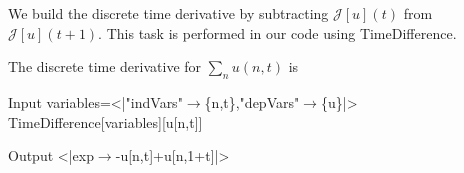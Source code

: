 \documentclass[runningheads]{llncs}
\newcommand{\1}{\chi}
\begin{document}
We build the discrete time derivative by subtracting $\mathcal{J}[u](t)$ from $\mathcal{J}[u](t+1)$. This task is performed in our code using {\sc TimeDifference}.
\begin{example}
	The discrete time derivative for $\sum_n u(n,t)$ is
	
	
	\begin{small}
		\begin{mmaCell}[moredefined={variables, expression, TimeDifference}]{Input}
  variables=<|"indVars"\(\pmb{\to}\)\{n,t\},"depVars"\(\pmb{\to}\)\{u\}|>
  TimeDifference[variables][u[n,t]]
  
\end{mmaCell}
		\begin{mmaCell}{Output}
  <|exp\(\to\)-u[n,t]+u[n,1+t]|>
\end{mmaCell}
	\end{small}
\end{example}
	
\end{document}
